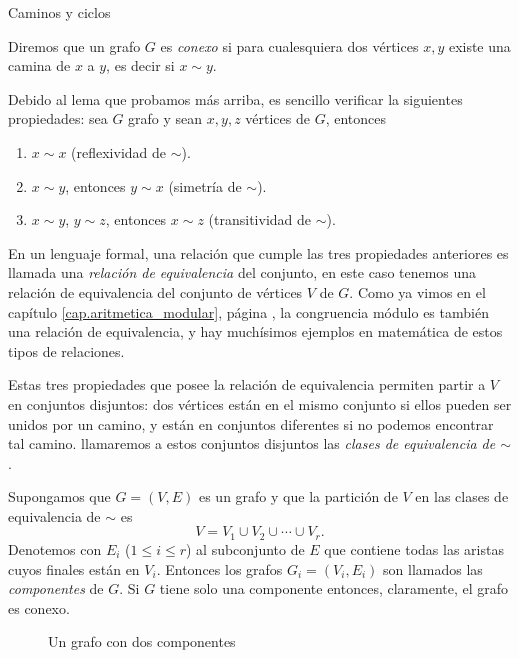 \begin{section}{Caminos y ciclos}
\begin{definicion} Diremos que un grafo  $G$ es \textit{conexo} si para cualesquiera dos vértices $x,y$ existe una camina de $x$ a $y$, es decir si  $x \sim y$. 
\end{definicion}

Debido al lema que probamos más arriba, es sencillo verificar la siguientes propiedades: sea $G$ grafo y sean $x,y,z$ vértices de $G$, entonces
\begin{enumerate}[label=\textit{\alph*)}]
\item  $x \sim x$ (reflexividad de $\sim$).
\item  $x \sim y$, entonces $y \sim x$ (simetría de $\sim$).
\item  $x \sim y$,  $y \sim z$, entonces  $x \sim z$ (transitividad  de $\sim$).
\end{enumerate}


En un lenguaje formal, una relación que  cumple las tres propiedades anteriores es llamada una  \textit{relación de equivalencia} del conjunto, en este caso tenemos una relación de equivalencia del conjunto de vértices $V$ de $G$. Como ya vimos en el capítulo \ref{cap.aritmetica_modular}, página  \pageref{relacion-de-equivalencia}, la congruencia módulo es también una relación de equivalencia, y hay muchísimos ejemplos en matemática de estos tipos de relaciones. 

Estas tres propiedades que posee la relación de equivalencia permiten partir a $V$ en conjuntos disjuntos: dos vértices están en el mismo conjunto si ellos pueden ser unidos por un camino, y están en conjuntos diferentes si no podemos encontrar tal camino. llamaremos a estos conjuntos disjuntos las \textit{clases de equivalencia de $\sim$}.

\begin{definicion}Supongamos que $G=(V,E)$ es un grafo y que la partición de $V$ en las clases de equivalencia de $\sim$ es
$$
V= V_1 \cup V_2 \cup \cdots \cup V_r.
$$
Denotemos con $E_i$ ($1\le i \le r$) al subconjunto de $E$ que contiene todas las aristas cuyos finales están en $V_i$. Entonces los grafos $G_i=(V_i,E_i)$ son llamados las \textit{componentes}     de $G$. Si $G$ tiene solo una componente entonces, claramente, el grafo es {conexo}.
\end{definicion}

\begin{figure}[t]
    \begin{center}
\end{center}
\caption{Un grafo con dos componentes} \label{f5.6}
\end{figure}


\end{section}
